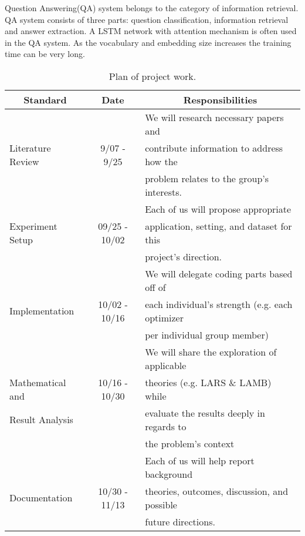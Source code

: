 Question Answering(QA) system belongs to the category of information retrieval. QA system consists of three parts: question classification, information retrieval and answer extraction. A LSTM network with attention mechanism is often used in the QA system. As the vocabulary and embedding size increases the training time can be very long.\\






\begin{table}[!t]
\vspace{-15pt}
\scriptsize
\vspace{7pt}
\caption{Plan of project work.}\label{tbl:planofwork}
\vspace{-15pt}
\begin{center}
\begin{tabular}{ l|c|l}
  \multicolumn{1}{c|}{Standard} &
 \multicolumn{1}{c|}{Date} &
 \multicolumn{1}{c}{Responsibilities}\\
\hline
& & We will research necessary papers and  \\
 Literature Review & 9/07 - 9/25 &  contribute information to address how the  \\
 & &  problem relates to the group's interests. \\\hline
& & Each of us will propose appropriate \\
Experiment Setup & 	09/25 - 10/02 & application, setting, and dataset for this\\
& &  project's direction.\\\hline
& & We will delegate coding parts based off of \\
Implementation & 10/02 - 10/16  & each individual's strength (e.g. each optimizer \\
& & per individual group member) \\\hline
& & We will share the exploration of applicable \\
Mathematical and & 10/16 - 10/30 &  theories (e.g. LARS \& LAMB) while \\ 
Result Analysis & &	  evaluate the results deeply in regards to  \\
& & the problem's context\\\hline
& & Each of us will help report background \\
Documentation & 10/30 - 11/13 &  theories, outcomes, discussion, and possible\\
& &  future directions. \\


\end{tabular}
\end{center}
\vspace{-15pt}
\end{table}